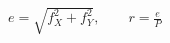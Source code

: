 \documentclass[border=3pt]{standalone}
\begin{document}
\color{ink}\fontsize{25}{32}\selectfont
$\displaystyle e=\sqrt{f_X^2+f_Y^2},\qquad r=\frac{e}{P}$
\end{document}
